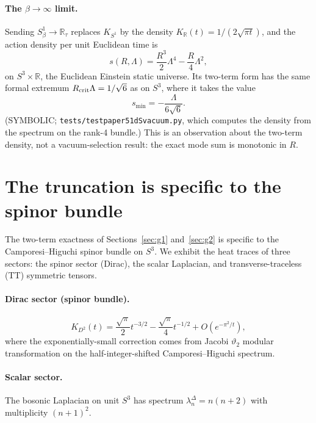 \documentclass[11pt,a4paper]{article}
\theoremstyle{plain}
\theoremstyle{definition}
\newcommand{\sthree}{S^{3}}
\newcommand{\Rcrit}{R_{\rm crit}}
\renewcommand{\_}{\textunderscore\allowbreak}
\begin{document}
\paragraph{The $\beta \to \infty$ limit.} Sending $S^1_\beta \to
\mathbb{R}_\tau$ replaces $K_{S^1}$ by the density $K_{\mathbb{R}}(t) =
1/(2\sqrt{\pi t})$, and the action density per unit Euclidean time is
\begin{equation}
  s(R, \Lambda) = \frac{R^3}{2} \Lambda^4 - \frac{R}{4} \Lambda^2,
\end{equation}
on $\sthree \times \mathbb{R}$, the Euclidean Einstein static universe. Its
two-term form has the same formal extremum $\Rcrit\Lambda = 1/\sqrt{6}$ as
on $\sthree$, where it takes the value
\begin{equation}
  s_{\min} = -\frac{\Lambda}{6 \sqrt{6}}.
  \label{thm:dS_vacuum}
\end{equation}
(SYMBOLIC; \texttt{tests/test\_paper51\_dS\_vacuum.py}, which computes the
density from the spectrum on the rank-4 bundle.) This is an observation
about the two-term density, not a vacuum-selection result: the exact mode
sum is monotonic in $R$.

\section{The truncation is specific to the spinor bundle}
\label{sec:g3}

The two-term exactness of Sections~\ref{sec:g1} and~\ref{sec:g2}
is specific to the Camporesi--Higuchi spinor bundle on
$\sthree$. We exhibit the heat traces of three sectors: the spinor sector
(Dirac), the scalar Laplacian, and transverse-traceless (TT) symmetric
tensors.

\paragraph{Dirac sector (spinor bundle).}
\begin{equation}
  K_{D^2}(t) = \frac{\sqrt{\pi}}{2} t^{-3/2} - \frac{\sqrt{\pi}}{4} t^{-1/2}
             + O(e^{-\pi^2/t}),
\end{equation}
where the exponentially-small correction comes from Jacobi $\vartheta_2$
modular transformation on the half-integer-shifted Camporesi--Higuchi
spectrum.

\paragraph{Scalar sector.} The bosonic Laplacian on unit $\sthree$
has spectrum $\lambda_n^{\Delta} = n(n+2)$ with multiplicity $(n+1)^2$.
\end{document}
